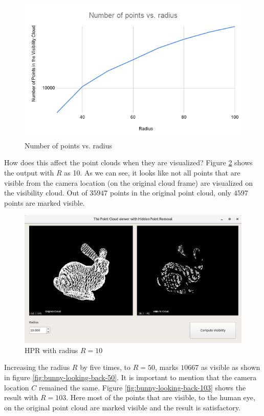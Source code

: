 \documentclass[11pt]{article}
\begin{document}
\begin{figure}[h]
\includegraphics[width=12cm]{Number-of-points-vs-radius}
\centering
\caption{Number of points vs. radius}
\label{fig:Number-of-points-vs-radius}
\end{figure}

How does this affect the point clouds when they are visualized? Figure \ref{fig:bunny-looking-back-10} shows the output with $R$ as 10. As we can see, it looks like not all points that are visible from the camera location (on the original cloud frame) are visualized on the visibility cloud. Out of $35947$ points in the original point cloud, only $4597$ points are marked visible.


\begin{figure}[h]
\includegraphics[width=12cm]{bunny-looking-back-10}
\centering
\caption{HPR with radius $R = 10$}
\label{fig:bunny-looking-back-10}
\end{figure}


Increasing the radius $R$ by five times, to $ R = 50 $, marks $10667$ as visible as shown in figure \ref{fig:bunny-looking-back-50}. It is important to mention that the camera location $C$ remained the same. Figure \ref{fig:bunny-looking-back-103} shows the result with $ R = 103 $. Here most of the points that are visible, to the human eye, on the original point cloud are marked visible and the result is satisfactory.
\end{document}
